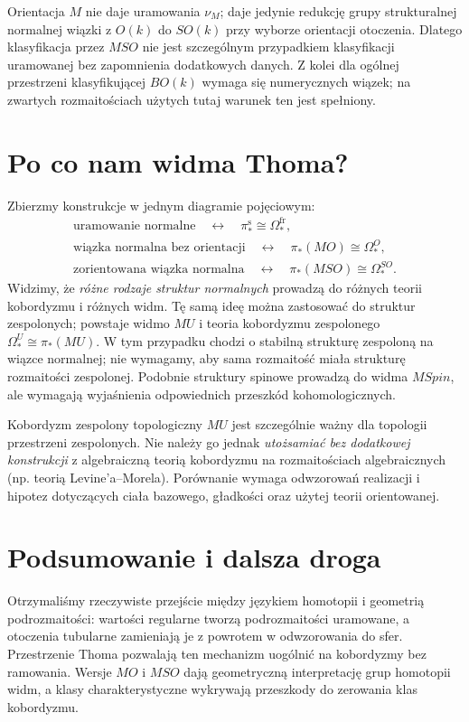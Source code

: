 \begin{uwaga}
Orientacja $M$ nie daje uramowania $\nu_M$;
daje jedynie redukcję grupy strukturalnej normalnej
wiązki z $O(k)$ do $SO(k)$ przy wyborze orientacji otoczenia.
Dlatego klasyfikacja przez $MSO$ nie jest szczególnym
przypadkiem klasyfikacji uramowanej bez zapomnienia
dodatkowych danych. Z kolei dla ogólnej przestrzeni
klasyfikującej $BO(k)$ wymaga się numerycznych wiązek;
na zwartych rozmaitościach użytych tutaj warunek ten
jest spełniony.
\end{uwaga}

\section{Po co nam widma Thoma?}
Zbierzmy konstrukcje w jednym diagramie pojęciowym:
\[
\begin{gathered}
\text{uramowanie normalne} \quad\longleftrightarrow\quad
\pi_*^{\mathrm s}\cong\Omega_*^{\mathrm{fr}},\\[3pt]
\text{wiązka normalna bez orientacji}\quad\longleftrightarrow\quad
\pi_*(MO)\cong\Omega_*^O,\\[3pt]
\text{zorientowana wiązka normalna}\quad\longleftrightarrow\quad
\pi_*(MSO)\cong\Omega_*^{SO}.
\end{gathered}
\]
Widzimy, że \emph{różne rodzaje struktur normalnych}
prowadzą do różnych teorii kobordyzmu i różnych widm.
Tę samą ideę można zastosować do struktur zespolonych;
powstaje widmo $MU$ i teoria kobordyzmu zespolonego
$\Omega_*^U\cong\pi_*(MU)$. W tym przypadku chodzi
o stabilną strukturę zespoloną na wiązce normalnej;
nie wymagamy, aby sama rozmaitość miała strukturę
rozmaitości zespolonej. Podobnie struktury spinowe
prowadzą do widma $MSpin$, ale wymagają wyjaśnienia
odpowiednich przeszkód kohomologicznych.

\begin{uwaga}
Kobordyzm zespolony topologiczny $MU$ jest szczególnie
ważny dla topologii przestrzeni zespolonych. Nie należy
go jednak \emph{utożsamiać bez dodatkowej konstrukcji}
z algebraiczną teorią kobordyzmu na rozmaitościach
algebraicznych (np. teorią Levine'a--Morela).
Porównanie wymaga odwzorowań realizacji i hipotez dotyczących
ciała bazowego, gładkości oraz użytej teorii orientowanej.
\end{uwaga}

\section{Podsumowanie i dalsza droga}
Otrzymaliśmy rzeczywiste przejście między językiem
homotopii i geometrią podrozmaitości: wartości regularne
tworzą podrozmaitości uramowane, a otoczenia tubularne
zamieniają je z powrotem w odwzorowania do sfer.
Przestrzenie Thoma pozwalają ten mechanizm uogólnić
na kobordyzmy bez ramowania. Wersje $MO$ i $MSO$
dają geometryczną interpretację grup homotopii widm,
a klasy charakterystyczne wykrywają przeszkody do
zerowania klas kobordyzmu.

